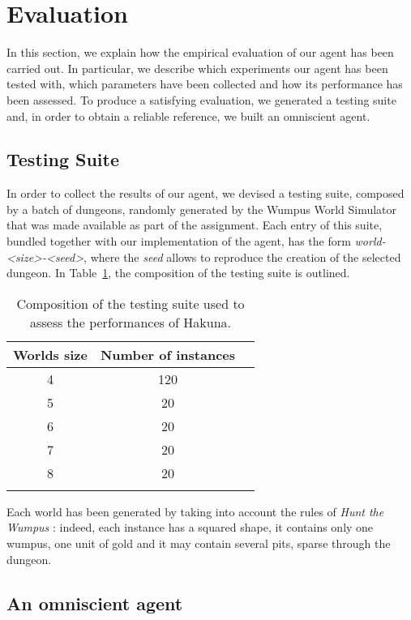 \documentclass{llncs}
\newcommand{\htw}{\emph{Hunt the Wumpus }}
\begin{document}
\section{Evaluation}

In this section, we explain how the empirical evaluation of our agent has been carried out.
In particular, we describe which experiments our agent has been tested with, which parameters have been collected and how its performance has been assessed.
To produce a satisfying evaluation, we generated a testing suite and, in order to obtain a reliable reference, we built an omniscient agent.

\subsection{Testing Suite}

In order to collect the results of our agent, we devised a testing suite, composed by a batch of dungeons, randomly generated by the Wumpus World Simulator that was made available as part of the assignment.
Each entry of this suite, bundled together with our implementation of the agent, has the form \emph{world-<size>-<seed>}, where the \emph{seed} allows to reproduce the creation of the selected dungeon.
In Table~\ref{tbl:test}, the composition of the testing suite is outlined.

\begin{table}[t]
	\label{tbl:test}
	\centering
	\begin{tabular}{ccc}
	\toprule
	Worlds size & Number of instances \\
	\midrule
	4 & 120 \\
	5 &  20 \\
	6 &  20 \\
	7 &  20 \\
	8 &  20 \\
	\bottomrule\\
	\end{tabular}
	\caption{Composition of the testing suite used to assess the performances of Hakuna.}
\end{table}

Each world has been generated by taking into account the rules of \htw: indeed, each instance has a squared shape, it contains only one wumpus, one unit of gold and it may contain several pits, sparse through the dungeon.


\subsection{An omniscient agent}
\end{document}
